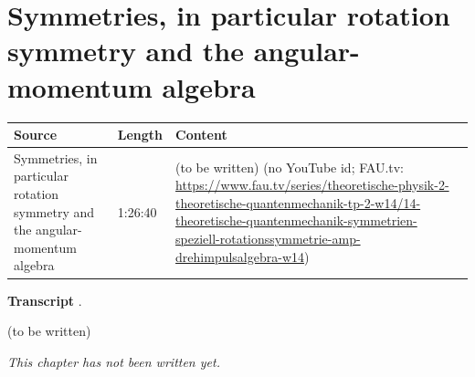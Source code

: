 \chapter{Symmetries, in particular rotation symmetry and the angular-momentum algebra}\label{ch:c14}
\begin{paracol}{2}

\begin{sources}
\begin{tabularx}{\linewidth}{@{}l l L@{}}
\toprule
\textbf{Source} & \textbf{Length} & \textbf{Content}\\
\midrule
Symmetries, in particular rotation symmetry and the angular-momentum algebra & 1:26:40 & (to be written) (no YouTube id; FAU.tv: \url{https://www.fau.tv/series/theoretische-physik-2-theoretische-quantenmechanik-tp-2-w14/14-theoretische-quantenmechanik-symmetrien-speziell-rotationssymmetrie-amp-drehimpulsalgebra-w14})\\
\bottomrule
\end{tabularx}

\smallskip
\textbf{Transcript} .
\end{sources}

\begin{reading}
(to be written)
\end{reading}

\emph{This chapter has not been written yet.}

\flushside
\end{paracol}
